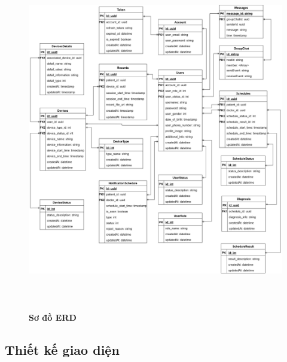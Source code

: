 \begin{figure}[H]
	\centering
	\includegraphics[width=15cm,height=15cm]{Images/system/ERD-db-Page-2.drawio.png}
	\caption[Sơ đồ ERD]{\bfseries \fontsize{12pt}{0pt}\selectfont Sơ đồ ERD}
	\label{fmECG_architecture-Database}
\end{figure}

\subsection{Thiết kế giao diện}


